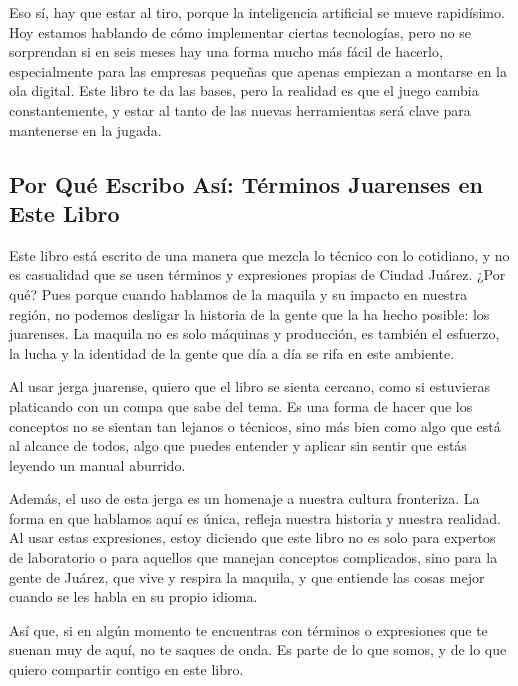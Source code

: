 \documentclass[
  letterpaper,
]{book}
\begin{document}
Eso sí, hay que estar al tiro, porque la inteligencia artificial se
mueve rapidísimo. Hoy estamos hablando de cómo implementar ciertas
tecnologías, pero no se sorprendan si en seis meses hay una forma mucho
más fácil de hacerlo, especialmente para las empresas pequeñas que
apenas empiezan a montarse en la ola digital. Este libro te da las
bases, pero la realidad es que el juego cambia constantemente, y estar
al tanto de las nuevas herramientas será clave para mantenerse en la
jugada.

\subsection*{Por Qué Escribo Así: Términos Juarenses en Este
Libro}\label{por-quuxe9-escribo-asuxed-tuxe9rminos-juarenses-en-este-libro}

Este libro está escrito de una manera que mezcla lo técnico con lo
cotidiano, y no es casualidad que se usen términos y expresiones propias
de Ciudad Juárez. ¿Por qué? Pues porque cuando hablamos de la maquila y
su impacto en nuestra región, no podemos desligar la historia de la
gente que la ha hecho posible: los juarenses. La maquila no es solo
máquinas y producción, es también el esfuerzo, la lucha y la identidad
de la gente que día a día se rifa en este ambiente.

Al usar jerga juarense, quiero que el libro se sienta cercano, como si
estuvieras platicando con un compa que sabe del tema. Es una forma de
hacer que los conceptos no se sientan tan lejanos o técnicos, sino más
bien como algo que está al alcance de todos, algo que puedes entender y
aplicar sin sentir que estás leyendo un manual aburrido.

Además, el uso de esta jerga es un homenaje a nuestra cultura
fronteriza. La forma en que hablamos aquí es única, refleja nuestra
historia y nuestra realidad. Al usar estas expresiones, estoy diciendo
que este libro no es solo para expertos de laboratorio o para aquellos
que manejan conceptos complicados, sino para la gente de Juárez, que
vive y respira la maquila, y que entiende las cosas mejor cuando se les
habla en su propio idioma.

Así que, si en algún momento te encuentras con términos o expresiones
que te suenan muy de aquí, no te saques de onda. Es parte de lo que
somos, y de lo que quiero compartir contigo en este libro.

\end{document}
